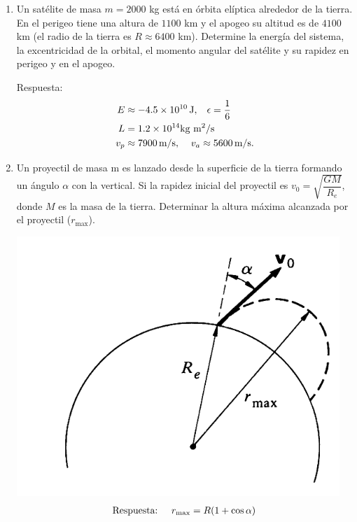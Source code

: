 \documentclass[11pt,twocolumn]{article}
\begin{document}
\begin{enumerate}
\item Un satélite de masa $m = 2000$ kg está en órbita elíptica alrededor de la tierra. 
En el perigeo tiene una altura de $1100$ km y el apogeo su altitud es de $4100$ km (el radio de la tierra es $R\approx 6400$ km). Determine la energía del sistema, la excentricidad  de la  orbital, el momento angular del satélite y su rapidez en perigeo y en el apogeo.

Respuesta:
\begin{align*}
E&\approx-4.5\times 10^{10}\,\text{J},\hspace{0.3 cm} \epsilon=\dfrac{1}{6}\,\\
L&=1.2\times 10^{14} \text{kg m$^2/$s}\\
v_p&\approx7900\, \text{m/s},\;\hspace{0.3 cm} v_a\approx5600\, \text{m/s}.
\end{align*}

\item Un proyectil de masa m es lanzado desde la superficie de la tierra formando un  ángulo $\alpha$ con la vertical. Si la rapidez inicial del proyectil es $v_0=\sqrt{\dfrac{GM}{R_e}}$, donde $M$ es la masa de la tierra. Determinar la altura máxima alcanzada por el proyectil ($r_{\text{max}}$).

\includegraphics[scale=0.3]{tiro}
\begin{align*}
\text{Respuesta:}\hspace{0.5 cm} r_{\text{max}}=R(1+\cos\alpha)
\end{align*}


\end{enumerate}
\end{document}
